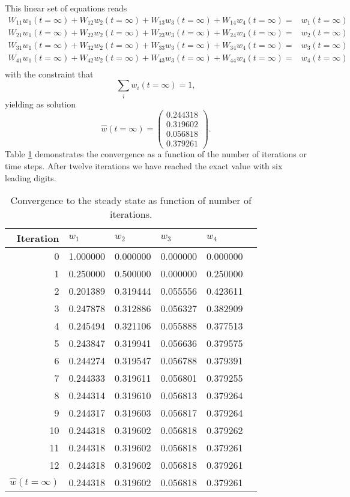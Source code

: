This linear set of equations reads
\begin{eqnarray}
 W_{11}w_1(t=\infty) +W_{12}w_2(t=\infty) +W_{13}w_3(t=\infty)+ W_{14}w_4(t=\infty)=&w_1(t=\infty) \nonumber \\
W_{21}w_1(t=\infty) + W_{22}w_2(t=\infty) + W_{23}w_3(t=\infty)+ W_{24}w_4(t=\infty)=&w_2(t=\infty) \nonumber \\
W_{31}w_1(t=\infty) + W_{32}w_2(t=\infty) + W_{33}w_3(t=\infty)+ W_{34}w_4(t=\infty)=&w_3(t=\infty) \nonumber \\
W_{41}w_1(t=\infty) + W_{42}w_2(t=\infty) + W_{43}w_3(t=\infty)+ W_{44}w_4(t=\infty)=&w_4(t=\infty) \nonumber \\
\end{eqnarray}
with the constraint that 
\[
   \sum_i w_i(t=\infty) = 1, 
\]
yielding as solution
\[
\hat{w}(t=\infty)=  \left(\begin{array}{c}0.244318 \\                   
                                 0.319602 \\  0.056818 \\  0.379261 \end{array} \right).
\]
Table \ref{tab:simplemodelw} demonstrates the convergence as a function of the number of iterations or
time steps. After  twelve iterations we have reached the exact value with six leading digits. 
\begin{table}
\caption{Convergence to the steady state as function of number of iterations. \label{tab:simplemodelw}} 
\begin{center}
\begin{tabular}{rlllll}\hline
Iteration &$w_1$   &$w_2$  &$w_3$&$w_4$\\\hline
0  & 1.000000 &0.000000  &0.000000& 0.000000 \\
1  & 0.250000 &0.500000  &0.000000& 0.250000 \\
2  & 0.201389 &  0.319444 &  0.055556 &  0.423611 \\
3  & 0.247878  &  0.312886  &  0.056327  &  0.382909 \\
4   &0.245494  &  0.321106  &  0.055888  &  0.377513\\
5   &0.243847  &  0.319941  &  0.056636  &  0.379575\\
6   & 0.244274  &  0.319547  &  0.056788  &  0.379391\\
7  &0.244333  &  0.319611  &  0.056801  &  0.379255\\
8  &0.244314  &  0.319610  &  0.056813  &  0.379264\\
9  &0.244317  &  0.319603  &  0.056817  &  0.379264\\
10  &0.244318  &  0.319602  &  0.056818  &  0.379262\\
11  &0.244318  &  0.319602  &  0.056818  &  0.379261\\
12  &0.244318  &  0.319602  &  0.056818  &  0.379261\\
$\hat{w}(t=\infty)$ & 0.244318  &  0.319602  &  0.056818  &  0.379261\\
\hline
\end{tabular} 
\end{center}   
\end{table}


